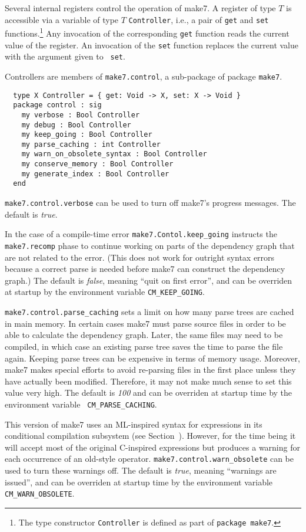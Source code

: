 Several internal registers control the operation of make7.  A register of
type $T$ is accessible via a variable of type $T$ {\tt Controller},
i.e., a pair of {\tt get} and {\tt set} functions.\footnote{The type
constructor {\tt Controller} is defined as part of {\tt package
make7}.}  Any invocation of the corresponding {\tt get} function reads
the current value of the register.  An invocation of the {\tt set}
function replaces the current value with the argument given to {\tt
set}.

Controllers are members of {\tt make7.control}, a sub-package of
package {\tt make7}.

\begin{verbatim}
  type X Controller = { get: Void -> X, set: X -> Void }
  package control : sig
    my verbose : Bool Controller
    my debug : Bool Controller
    my keep_going : Bool Controller
    my parse_caching : int Controller
    my warn_on_obsolete_syntax : Bool Controller
    my conserve_memory : Bool Controller
    my generate_index : Bool Controller
  end
\end{verbatim}

{\tt make7.control.verbose} can be used to turn off make7's progress
messages.  The default is {\em true}.

In the case of a compile-time error {\tt make7.Contol.keep\_going}
instructs the {\tt make7.recomp} phase to continue working on parts of
the dependency graph that are not related to the error.  (This does
not work for outright syntax errors because a correct parse is needed
before make7 can construct the dependency graph.)  The default is {\em
false}, meaning ``quit on first error'', and can be overriden at
startup by the environment variable {\tt CM\_KEEP\_GOING}.

{\tt make7.control.parse\_caching} sets a limit on how many parse trees
are cached in main memory.  In certain cases make7 must parse source
files in order to be able to calculate the dependency graph.  Later,
the same files may need to be compiled, in which case an existing
parse tree saves the time to parse the file again.  Keeping parse
trees can be expensive in terms of memory usage.  Moreover, make7 makes
special efforts to avoid re-parsing files in the first place unless
they have actually been modified.  Therefore, it may not make much
sense to set this value very high.  The default is {\em 100} and can
be overriden at startup time by the environment variable {\tt
CM\_PARSE\_CACHING}.

This version of make7 uses an ML-inspired syntax for expressions in its
conditional compilation subsystem (see Section~).
However, for the time being it will accept most of the original
C-inspired expressions but produces a warning for each occurrence of
an old-style operator. {\tt make7.control.warn\_obsolete} can be used to
turn these warnings off. The default is {\em true}, meaning ``warnings
are issued'', and can be overriden at startup time by the environment
variable {\tt CM\_WARN\_OBSOLETE}.

